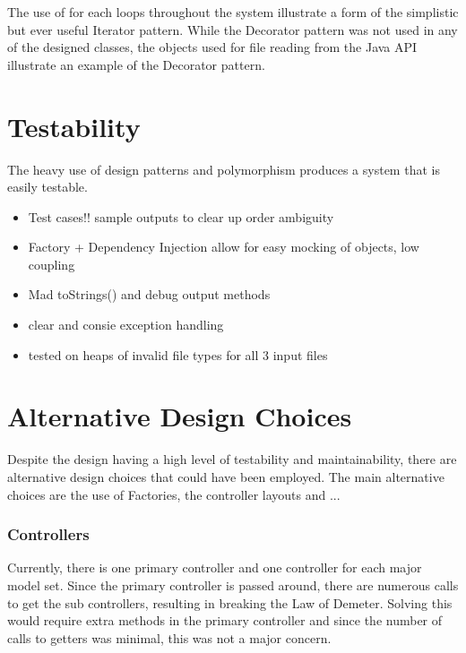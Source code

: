 \documentclass[]{article}
\begin{document}
The use of for each loops throughout the system illustrate a form of the simplistic but ever useful Iterator pattern. While the Decorator pattern was not used in any of the designed classes, the objects used for file reading from the Java API illustrate an example of the Decorator pattern.


\section*{Testability}

The heavy use of design patterns and polymorphism produces a system that is easily testable.

\begin{itemize}
	\item Test cases!! sample outputs to clear up order ambiguity
	\item Factory  + Dependency Injection allow for easy mocking of objects, low coupling
	\item Mad toStrings() and debug output methods
	\item clear and consie exception handling
	\item tested on heaps of invalid file types for all 3 input files
\end{itemize}


\section*{Alternative Design Choices}

Despite the design having a high level of testability and maintainability, there are alternative design choices that could have been employed. The main alternative choices are the use of Factories, the controller layouts and ...

\subsubsection*{Controllers}
Currently, there is one primary controller and one controller for each major model set. Since the primary controller is passed around, there are numerous calls to get the sub controllers, resulting in breaking the Law of Demeter. Solving this would require extra methods in the primary controller and since the number of calls to getters was minimal, this was not a major concern.
\end{document}
